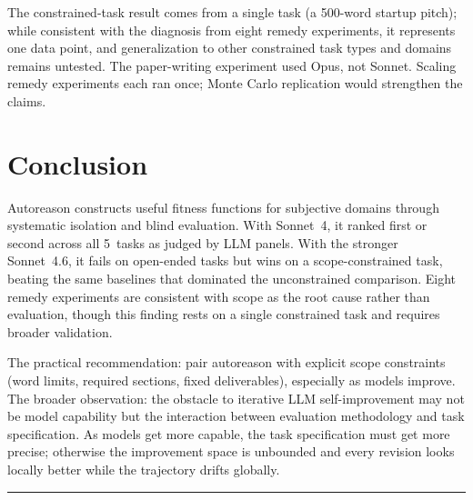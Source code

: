 \documentclass[10pt,twocolumn]{article}
\begin{document}
The constrained-task result comes from a single task (a 500-word startup pitch); while consistent with the diagnosis from eight remedy experiments, it represents one data point, and generalization to other constrained task types and domains remains untested. The paper-writing experiment used Opus, not Sonnet. Scaling remedy experiments each ran once; Monte Carlo replication would strengthen the claims.

\section{Conclusion}

Autoreason constructs useful fitness functions for subjective domains through systematic isolation and blind evaluation. With Sonnet~4, it ranked first or second across all 5~tasks as judged by LLM panels. With the stronger Sonnet~4.6, it fails on open-ended tasks but wins on a scope-constrained task, beating the same baselines that dominated the unconstrained comparison. Eight remedy experiments are consistent with scope as the root cause rather than evaluation, though this finding rests on a single constrained task and requires broader validation.

The practical recommendation: pair autoreason with explicit scope constraints (word limits, required sections, fixed deliverables), especially as models improve. The broader observation: the obstacle to iterative LLM self-improvement may not be model capability but the interaction between evaluation methodology and task specification. As models get more capable, the task specification must get more precise; otherwise the improvement space is unbounded and every revision looks locally better while the trajectory drifts globally.

\vspace{4pt}
\hrule
\vspace{6pt}
\end{document}
